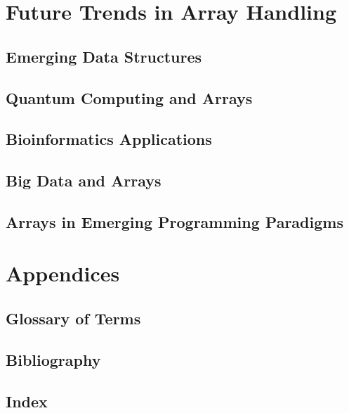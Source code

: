 \documentclass[12pt, oneside]{book}
\begin{document}
\chapter{Future Trends in Array Handling}
\section{Emerging Data Structures}
\section{Quantum Computing and Arrays}
\section{Bioinformatics Applications}
\section{Big Data and Arrays}
\section{Arrays in Emerging Programming Paradigms}
\chapter{Appendices}
\section{Glossary of Terms}
\section{Bibliography}
\section{Index}
\end{document}
